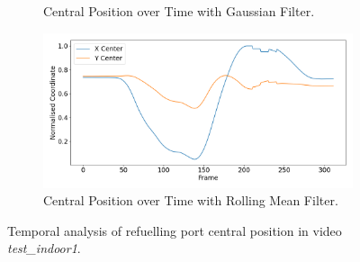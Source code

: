 \documentclass[12pt,oneside]{book} %
\begin{document}
\begin{figure}[H]
\begin{subfigure}[t]{0.65\textwidth}
        \caption{Central Position over Time with Gaussian Filter.}
        \label{fig:central-position-test-indoor1-gaussian}
    \end{subfigure}
    \hfill
    \begin{subfigure}[t]{0.65\textwidth}
        \includegraphics[width=\textwidth]{figures/bbox_metrics/test_indoor1 (Rolling Mean Filter)_central_position.png}
        \caption{Central Position over Time with Rolling Mean Filter.}
        \label{fig:central-position-test-indoor1-rolling}
    \end{subfigure}
    \caption{Temporal analysis of refuelling port central position in video \textit{test\_indoor1}.}
    \label{fig:central-position-test-indoor1}
\end{figure}
\end{document}
